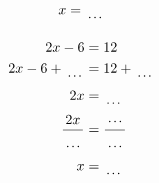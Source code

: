 \documentclass[12pt]{article}
\newcounter{minipagecount}
\begin{document}
\begin{multicols}{2}
\begin{minipage}[t]{0.45\textwidth}
\begin{align*}
        x &= \dotuline{\hspace{5mm}}\\
    \end{align*}
\end{minipage} %
\noindent{(\theminipagecount)}\hspace{0.1mm} %
\begin{minipage}[t]{0.45\textwidth} %
    \vspace{-26pt}  %
    \raggedright %
    \begin{align*} %
        2x - 6 &= 12\\
        2x - 6 + \dotuline{\hspace{5mm}} &= 12 + \dotuline{\hspace{5mm}}\\
        2x &= \dotuline{\hspace{5mm}}\\
        \frac{2x}{\dotuline{\hspace{5mm}}} &= \frac{\dotuline{\hspace{5mm}}}{\dotuline{\hspace{5mm}}}\\
        x &= \dotuline{\hspace{5mm}}\\
    \end{align*}
\end{minipage} %
\noindent{(\theminipagecount)}\hspace{0.1mm} %
\begin{minipage}[t]{0.45\textwidth} %
    \vspace{-26pt}  %

\end{minipage}
\end{multicols}
\end{document}
